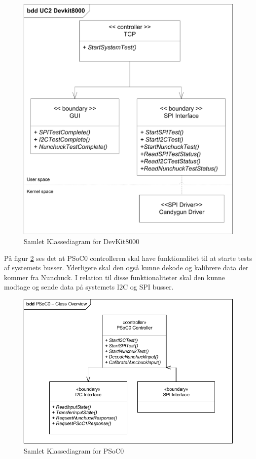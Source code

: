 \begin{figure}[H]
	\centering
	\includegraphics[width=\textwidth] {Systemarkitektur/images/Devkitklassediagram.png}
	\caption{Samlet Klassediagram for DevKit8000}
	\label{fig:CompleteClassDiagramDevKit8000}
\end{figure}

På figur \ref{fig:CompleteClassDiagramPSoC0} ses det at PSoC0 controlleren skal have funktionalitet til at starte tests af systemets busser. Yderligere skal den også kunne dekode og kalibrere data der kommer fra Nunchuck. I relation til disse funktionaliteter skal den kunne modtage og sende data på systemets I2C og SPI busser.

\begin{figure}[H]
	\centering
	\includegraphics[width=\textwidth] {Systemarkitektur/images/CompleteClassDiagramPSoC0}
	\caption{Samlet Klassediagram for PSoC0}
	\label{fig:CompleteClassDiagramPSoC0}
\end{figure}

